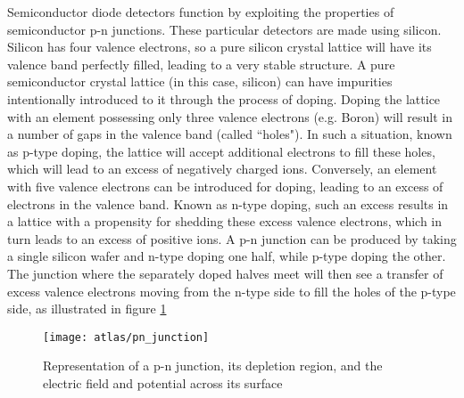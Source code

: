         

        Semiconductor diode detectors function by exploiting the properties of semiconductor p-n junctions.
        These particular detectors are made using silicon.
        Silicon has four valence electrons, so a pure silicon crystal lattice will have its valence band perfectly filled, leading to a very stable structure.
        A pure semiconductor crystal lattice (in this case, silicon) can have impurities intentionally introduced to it through the process of doping.
        Doping the lattice with an element possessing only three valence electrons (e.g. Boron) will result in a number of gaps in the valence band (called ``holes").
        In such a situation, known as p-type doping, the lattice will accept additional electrons to fill these holes, which will lead to an excess of negatively charged ions.
        Conversely, an element with five valence electrons can be introduced for doping, leading to an excess of electrons in the valence band.
        Known as n-type doping, such an excess results in a lattice with a propensity for shedding these excess valence electrons, which in turn leads to an excess of positive ions.
        A p-n junction can be produced by taking a single silicon wafer and n-type doping one half, while p-type doping the other.
        The junction where the separately doped halves meet will then see a transfer of excess valence electrons moving from the n-type side to fill the holes of the p-type side, as illustrated in figure \ref{fig:pn_junction}

        \begin{figure}
            \texttt{[image: atlas/pn\_junction]}
            \caption{Representation of a p-n junction, its depletion region, and the electric field and potential across its surface \cite{Havránek:2317324}}
            \label{fig:pn_junction}
        \end{figure}

